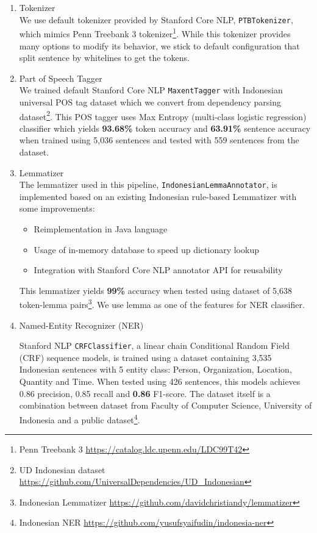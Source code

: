 \documentclass[conference,compsoc,12pt]{IEEEtran}
\begin{document}
\begin{enumerate}

\item Tokenizer \\
We use default tokenizer provided by Stanford Core NLP, \verb|PTBTokenizer|\cite{manningptbtokenizer}, which mimics Penn Treebank 3 tokenizer\footnote{Penn Treebank 3 \url{https://catalog.ldc.upenn.edu/LDC99T42}}. While this tokenizer provides many options to modify its behavior, we stick to default configuration that split sentence by whitelines to get the tokens.\\

\item Part of Speech Tagger \\
We trained default Stanford Core NLP \verb|MaxentTagger|\cite{toutanova2003feature} with Indonesian universal POS tag dataset which we convert from dependency parsing dataset\footnote{UD Indonesian dataset \url{https://github.com/UniversalDependencies/UD_Indonesian}}. This POS tagger uses Max Entropy (multi-class logistic regression) classifier which yields \textbf{93.68\%} token accuracy and \textbf{63.91\%} sentence accuracy when trained using 5,036 sentences and tested with 559 sentences from the dataset. \\

\item Lemmatizer \\
The lemmatizer used in this pipeline, \verb|IndonesianLemmaAnnotator|, is implemented based on an existing Indonesian rule-based Lemmatizer\cite{suhartono2014lemmatization} with some improvements:

\begin{itemize}
\item Reimplementation in Java language
\item Usage of in-memory database to speed up dictionary lookup
\item Integration with Stanford Core NLP annotator API for reusability
\end{itemize}

This lemmatizer yields \textbf{99\%} accuracy when tested using dataset of 5,638 token-lemma pairs\footnote{Indonesian Lemmatizer \url{https://github.com/davidchristiandy/lemmatizer}}. We use lemma as one of the features for NER classifier. \\

\item Named-Entity Recognizer (NER)

Stanford NLP \verb|CRFClassifier|\cite{finkel2005incorporating}, a linear chain Conditional Random Field (CRF) sequence models, is trained using a dataset containing 3,535 Indonesian sentences with 5 entity class: Person, Organization, Location, Quantity and Time. When tested using 426 sentences, this models achieves 0.86 precision, 0.85 recall and \textbf{0.86} F1-score. The dataset itself is a combination between dataset from Faculty of Computer Science, University of Indonesia and a public dataset\footnote{Indonesian NER \url{https://github.com/yusufsyaifudin/indonesia-ner}}. \\


\end{enumerate}
\end{document}
